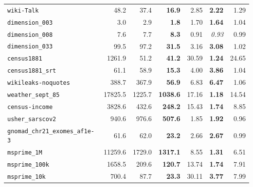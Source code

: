 \begin{table}[!t]
\begin{tabular}{@{}l r r r r r r@{}}
\texttt{wiki-Talk} & {48.2} & {37.4} & {\textbf{16.9}} & {2.85} & {\textbf{2.22}} & {1.29} \\
\texttt{dimension\_003} & {3.0} & {2.9} & {\textbf{1.8}} & {1.70} & {\textbf{1.64}} & {1.04} \\
\texttt{dimension\_008} & {7.6} & {7.7} & {\textbf{8.3}} & {0.91} & {\textit{0.93}} & {0.99} \\
\texttt{dimension\_033} & {99.5} & {97.2} & {\textbf{31.5}} & {3.16} & {\textbf{3.08}} & {1.02} \\
\texttt{census1881} & {1261.9} & {51.2} & {\textbf{41.2}} & {30.59} & {\textbf{1.24}} & {24.65} \\
\texttt{census1881\_srt} & {61.1} & {58.9} & {\textbf{15.3}} & {4.00} & {\textbf{3.86}} & {1.04} \\
\texttt{wikileaks-noquotes} & {388.7} & {367.9} & {\textbf{56.9}} & {6.83} & {\textbf{6.47}} & {1.06} \\
\texttt{weather\_sept\_85} & {17825.5} & {1225.7} & {\textbf{1038.6}} & {17.16} & {\textbf{1.18}} & {14.54} \\
\texttt{census-income} & {3828.6} & {432.6} & {\textbf{248.2}} & {15.43} & {\textbf{1.74}} & {8.85} \\
\texttt{usher\_sarscov2} & {940.6} & {976.6} & {\textbf{507.6}} & {1.85} & {\textbf{1.92}} & {0.96} \\
\texttt{gnomad\_chr21\_exomes\_af1e-3} & {61.6} & {62.0} & {\textbf{23.2}} & {2.66} & {\textbf{2.67}} & {0.99} \\
\texttt{msprime\_1M} & {11259.6} & {1729.0} & {\textbf{1317.1}} & {8.55} & {\textbf{1.31}} & {6.51} \\
\texttt{msprime\_100k} & {1658.5} & {209.6} & {\textbf{120.7}} & {13.74} & {\textbf{1.74}} & {7.91} \\
\texttt{msprime\_10k} & {700.4} & {87.7} & {\textbf{23.3}} & {30.11} & {\textbf{3.77}} & {7.99} \\
\bottomrule
\end{tabular}
\end{table}
